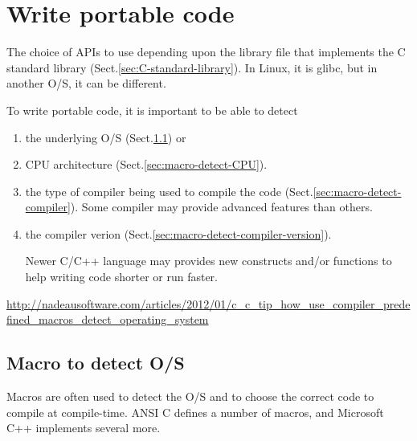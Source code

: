 


\section{Write portable code}
\label{sec:CCpp_portable-code}

The choice of APIs to use depending upon the 
library file that implements the C standard library
(Sect.\ref{sec:C-standard-library}). In Linux, it is glibc, but in another O/S,
it can be different.

To write portable code,   it is important to be able to detect 
\begin{enumerate}
  \item  the underlying O/S
(Sect.\ref{sec:macro-detect-OS}) or 

  \item CPU architecture
(Sect.\ref{sec:macro-detect-CPU}).

  \item the type of compiler being used to compile the code
(Sect.\ref{sec:macro-detect-compiler}). Some compiler may provide advanced
features than others.

  \item the compiler verion (Sect.\ref{sec:macro-detect-compiler-version}).
  
Newer C/C++ language may provides new constructs and/or functions to help
writing code shorter or run faster.
    
\end{enumerate}

\url{http://nadeausoftware.com/articles/2012/01/c_c_tip_how_use_compiler_predefined_macros_detect_operating_system}

\subsection{Macro to detect O/S}
\label{sec:macro-detect-OS}

Macros are often used to detect the O/S and to choose the correct code to compile at compile-time.
ANSI C defines a number of macros, and Microsoft C++ implements several more.

